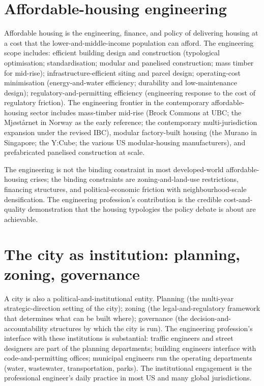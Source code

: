 \section{Affordable-housing engineering}

Affordable housing is the engineering, finance, and policy of delivering housing at a cost that the lower-and-middle-income population can afford. The engineering scope includes: efficient building design and construction (typological optimisation; standardisation; modular and panelised construction; mass timber for mid-rise); infrastructure-efficient siting and parcel design; operating-cost minimisation (energy-and-water efficiency; durability and low-maintenance design); regulatory-and-permitting efficiency (engineering response to the cost of regulatory friction). The engineering frontier in the contemporary affordable-housing sector includes mass-timber mid-rise (Brock Commons at UBC; the Mj{\o}st{\aa}rnet in Norway as the early reference; the contemporary multi-jurisdiction expansion under the revised IBC), modular factory-built housing (the Murano in Singapore; the Y:Cube; the various US modular-housing manufacturers), and prefabricated panelised construction at scale.

The engineering is not the binding constraint in most developed-world affordable-housing crises; the binding constraints are zoning-and-land-use restrictions, financing structures, and political-economic friction with neighbourhood-scale densification. The engineering profession's contribution is the credible cost-and-quality demonstration that the housing typologies the policy debate is about are achievable.

\section{The city as institution: planning, zoning, governance}

A city is also a political-and-institutional entity. Planning (the multi-year strategic-direction setting of the city); zoning (the legal-and-regulatory framework that determines what can be built where); governance (the decision-and-accountability structures by which the city is run). The engineering profession's interface with these institutions is substantial: traffic engineers and street designers are part of the planning departments; building engineers interface with code-and-permitting offices; municipal engineers run the operating departments (water, wastewater, transportation, parks). The institutional engagement is the professional engineer's daily practice in most US and many global jurisdictions.

